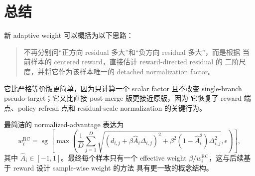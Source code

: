 \documentclass[11pt,a4paper]{article}
\newcommand{\sg}{\operatorname{sg}}
\newcommand{\eps}{\epsilon}
\newcommand{\R}{\mathrm{RC}}
\begin{document}
\section{总结}

新 adaptive weight 可以概括为以下思路：
\begin{quote}
\color{accentdark}
不再分别问“正方向 residual 多大”和“负方向 residual 多大”，而是根据
当前样本的 centered reward，直接估计 reward-directed residual 的
二阶尺度，并将它作为该样本唯一的 detached normalization factor。
\end{quote}

它比严格等价版更简单，因为只计算一个 scalar factor 且不改变
single-branch pseudo-target；它又比直接 post-merge 版更接近原版，因为
它恢复了 reward 端点、policy refresh 点和 residual-scale normalization
的关键行为。

最简洁的 normalized-advantage 表达为
\begin{equation}
\boxed{
w_i^{\R}
=
\sg\!\left[
\max\!\left(
\frac{1}{D}
\sum_{j=1}^{D}
\sqrt{
\left(d_{i,j}+\beta\widehat{A}_i\Delta_{i,j}\right)^2
+
\beta^2(1-\widehat{A}_i^2)\Delta_{i,j}^2
},
\eps
\right)
\right],
}
\end{equation}
其中 $\widehat{A}_i\in[-1,1]$。最终每个样本只有一个 effective weight
$\beta/w_i^{\R}$，这与后续基于 reward 设计 sample-wise weight 的方法
具有更一致的概念结构。
\end{document}
